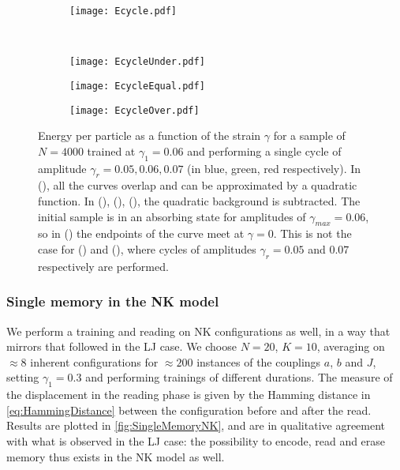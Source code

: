 \begin{landscape}
	\begin{figure}
		\centering
		\begin{subfigure}[b]{0.48\textwidth}
				\centering
				\texttt{[image: Ecycle.pdf]}
				\caption{\label{fig:UcycleAll}}
		\end{subfigure} 	\\
		\begin{subfigure}[b]{0.48\textwidth}
				\centering
				\texttt{[image: EcycleUnder.pdf]}
				\caption{\label{fig:UcycleUnder}}
		\end{subfigure} 
		\begin{subfigure}[b]{0.48\textwidth}
				\centering
				\texttt{[image: EcycleEqual.pdf]}
				\caption{\label{fig:UcycleEqual}}
		\end{subfigure} 
		\begin{subfigure}[b]{0.48\textwidth}
				\centering
				\texttt{[image: EcycleOver.pdf]}
				\caption{\label{fig:UcycleOver}}
		\end{subfigure} 
	\caption{
	Energy per particle as a function of the strain $\gamma$ for a sample of $N=4000$ trained at $\gamma_{1} = 0.06$ and performing a single cycle of amplitude $\gamma_{r} = 0.05, 0.06, 0.07$ (in blue, green, red respectively).
	In (), all the curves overlap and can be approximated by a quadratic function. In (), (), (), the quadratic background is subtracted. The initial sample is in an absorbing state for amplitudes of $\gamma_{max} = 0.06$, so in () the endpoints of the curve meet at $\gamma = 0$. This is not the case for () and (), where cycles of amplitudes $\gamma_{r} = 0.05$ and $0.07$ respectively are performed.  
	\label{fig:EnergyVsStrainAbsorbing}}
	\end{figure}
\end{landscape}

\subsubsection{Single memory in the NK model}

We perform a training and reading on NK configurations as well, in a way that mirrors that followed in the LJ case. We choose $N = 20$, $K = 10$, averaging on $\approx 8$ inherent configurations for $\approx 200$ instances of the couplings $a$, $b$ and $J$, setting $\gamma_{1} = 0.3$ and performing trainings of different durations. The measure of the displacement in the reading phase is given by the Hamming distance in \autoref{eq:HammingDistance} between the configuration before and after the read. Results are plotted in \autoref{fig:SingleMemoryNK}, and are in qualitative agreement with what is observed in the LJ case: the possibility to encode, read and erase memory thus exists in the NK model as well. 

